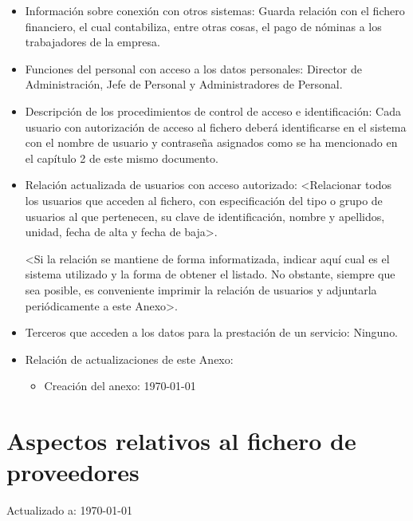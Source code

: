 \documentclass[a4paper,11pt,bibtotoc,noliststotoc]{scrbook}
\begin{document}
\begin{itemize}
\begin{itemize}
\end{itemize}


\item Información sobre conexión con otros sistemas: Guarda relación con el fichero financiero, el cual contabiliza, entre otras cosas, el pago de nóminas a los trabajadores de la empresa.

\item Funciones del personal con acceso a los datos personales: Director de Administración, Jefe de Personal y Administradores de Personal.

\item Descripción de los procedimientos de control de acceso e identificación: Cada usuario con autorización de acceso al fichero deberá identificarse en el sistema con el nombre de usuario y contraseña asignados como se ha mencionado en el capítulo 2 de este mismo documento.

\item Relación actualizada de usuarios con acceso autorizado: <Relacionar todos los usuarios que acceden al fichero, con especificación del tipo o grupo de usuarios al que pertenecen, su clave de identificación, nombre y apellidos, unidad, fecha de alta y fecha de baja>.

<Si la relación se mantiene de forma informatizada, indicar aquí cual es el sistema utilizado y la forma de obtener el listado. No obstante, siempre que sea posible, es conveniente imprimir la relación de usuarios y adjuntarla periódicamente a este Anexo>.

\item Terceros que acceden a los datos para la prestación de un servicio: Ninguno.

\item Relación de actualizaciones de este Anexo: 

	\begin{itemize}
	\item Creación del anexo: \today
	\end{itemize}

\end{itemize}







\section{Aspectos relativos al fichero de proveedores}


Actualizado a: \today
\end{document}
